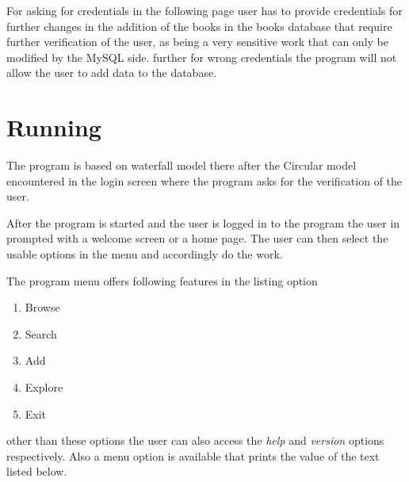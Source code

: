 \documentclass[12pt, a4paper, titlepage, openany]{report}
\begin{document}
For asking for credentials in the following page user has to provide credentials for further changes in the addition of the books in the books database that require further verification of the user, as being a very sensitive work that can only be modified by the MySQL side.
further for wrong credentials the program will not allow the user to add data to the database.

\newpage

\section{Running}
The program is based on waterfall model there after the Circular model encountered in the login screen where the program asks for the verification of the user.

After the program is started and the user is logged in to the program  
the user in prompted with a welcome screen or a home page. The user can then select the usable options in the menu and accordingly do the work.

The program menu offers following features in the listing option
\begin{enumerate}
\item Browse
\item Search
\item Add
\item Explore
\item Exit
\end{enumerate}
other than these options the user can also access the \emph{help} and \emph{version} options respectively. Also a menu option is available that prints the value of the text listed below.
\end{document}

